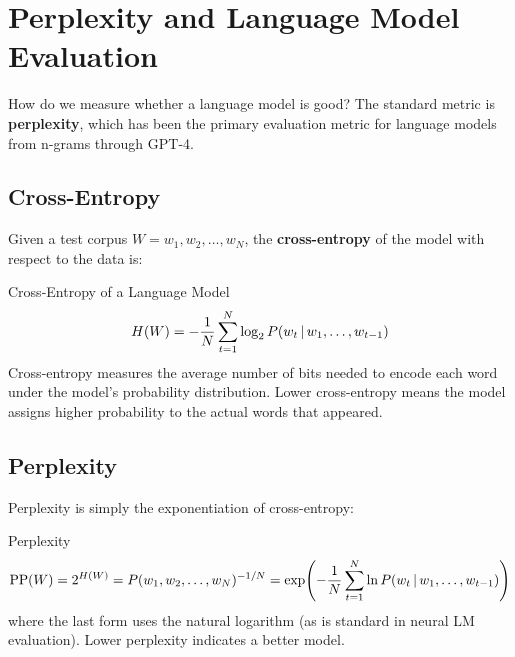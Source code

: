 \section{Perplexity and Language Model Evaluation}
\label{sec:perplexity}

How do we measure whether a language model is good?  The standard metric is
\textbf{perplexity}, which has been the primary evaluation metric for language
models from n-grams through GPT-4.

\subsection{Cross-Entropy}

Given a test corpus $W = w_1, w_2, \ldots, w_N$, the \textbf{cross-entropy}
of the model with respect to the data is:

\begin{mathresult}{Cross-Entropy of a Language Model}
\begin{equation}
H(W) = -\frac{1}{N} \sum_{t=1}^{N} \log_2 P(w_t \,|\, w_1, \ldots, w_{t-1})
\label{eq:cross_entropy_lm}
\end{equation}
Cross-entropy measures the average number of bits needed to encode each word
under the model's probability distribution.  Lower cross-entropy means the
model assigns higher probability to the actual words that appeared.
\end{mathresult}

\subsection{Perplexity}

Perplexity is simply the exponentiation of cross-entropy:

\begin{mathresult}{Perplexity}
\begin{equation}
\text{PP}(W) = 2^{H(W)}
= P(w_1, w_2, \ldots, w_N)^{-1/N}
= \exp\!\left(-\frac{1}{N}\sum_{t=1}^{N} \ln P(w_t \,|\, w_1, \ldots, w_{t-1})\right)
\label{eq:perplexity}
\end{equation}
where the last form uses the natural logarithm (as is standard in neural LM
evaluation).  Lower perplexity indicates a better model.
\end{mathresult}


